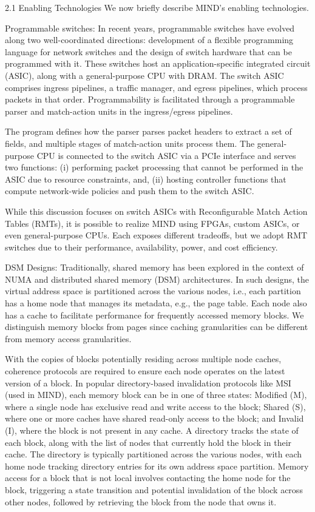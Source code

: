 2.1 Enabling Technologies
We now briefly describe MIND’s enabling technologies.

Programmable switches: In recent years, programmable switches have evolved along two well-coordinated directions: development of a flexible programming language for network switches and the design of switch hardware that can be programmed with it. These switches host an application-specific integrated circuit (ASIC), along with a general-purpose CPU with DRAM. The switch ASIC comprises ingress pipelines, a traffic manager, and egress pipelines, which process packets in that order. Programmability is facilitated through a programmable parser and match-action units in the ingress/egress pipelines.

The program defines how the parser parses packet headers to extract a set of fields, and multiple stages of match-action units process them. The general-purpose CPU is connected to the switch ASIC via a PCIe interface and serves two functions: (i) performing packet processing that cannot be performed in the ASIC due to resource constraints, and, (ii) hosting controller functions that compute network-wide policies and push them to the switch ASIC.

While this discussion focuses on switch ASICs with Reconfigurable Match Action Tables (RMTs), it is possible to realize MIND using FPGAs, custom ASICs, or even general-purpose CPUs. Each exposes different tradeoffs, but we adopt RMT switches due to their performance, availability, power, and cost efficiency.

DSM Designs: Traditionally, shared memory has been explored in the context of NUMA and distributed shared memory (DSM) architectures. In such designs, the virtual address space is partitioned across the various nodes, i.e., each partition has a home node that manages its metadata, e.g., the page table. Each node also has a cache to facilitate performance for frequently accessed memory blocks. We distinguish memory blocks from pages since caching granularities can be different from memory access granularities.

With the copies of blocks potentially residing across multiple node caches, coherence protocols are required to ensure each node operates on the latest version of a block. In popular directory-based invalidation protocols like MSI (used in MIND), each memory block can be in one of three states: Modified (M), where a single node has exclusive read and write access to the block; Shared (S), where one or more caches have shared read-only access to the block; and Invalid (I), where the block is not present in any cache. A directory tracks the state of each block, along with the list of nodes that currently hold the block in their cache. The directory is typically partitioned across the various nodes, with each home node tracking directory entries for its own address space partition. Memory access for a block that is not local involves contacting the home node for the block, triggering a state transition and potential invalidation of the block across other nodes, followed by retrieving the block from the node that owns it.

